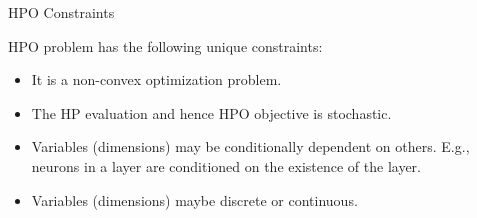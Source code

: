 \documentclass{beamer}
\begin{document}
\begin{frame}[t]{HPO Constraints}

HPO problem has the following unique constraints:

\begin{itemize}
\item It is a non-convex optimization problem.
\item The HP evaluation and hence HPO objective is stochastic.
\item Variables (dimensions) may be conditionally dependent on others. E.g.,  neurons in a layer are conditioned on the existence of the layer.
\item Variables (dimensions) maybe discrete or continuous.
\end{itemize}


\end{frame}
\end{document}
